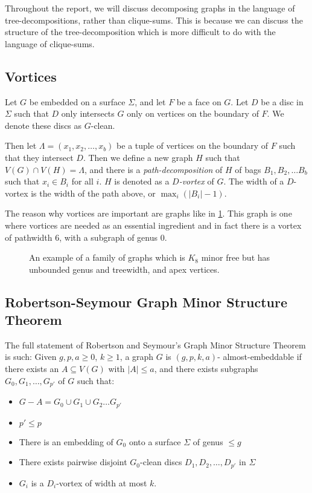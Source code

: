 Throughout the report, we will discuss decomposing graphs in the language of tree-decompositions, rather than clique-sums. This is because we can discuss the structure of the tree-decomposition which is more difficult to do with the language of clique-sums.

\subsection{Vortices}\label{sssec:vortices}
Let \(G\) be embedded on a surface \(\Sigma\), and let \(F\) be a face on \(G\). Let \(D\) be a disc in \(\Sigma\) such that \(D\) only intersects \(G\) only on vertices on the boundary of \(F\). We denote these discs as \(G\)-clean. 

Then let \(\Lambda = (x_1, x_2, \ldots, x_b)\) be a tuple of vertices on the boundary of \(F\) such that they intersect \(D\). Then we define a new graph \(H\) such that \(V(G) \cap V(H) = \Lambda\), and there is a \textit{path-decomposition} of \(H\) of bags \(B_1, B_2, \ldots B_b\) such that \(x_i \in B_i\) for all \(i\). \(H\) is denoted as a \textit{\(D\)-vortex} of \(G\). The width of a \(D\)-vortex is the width of the path above, or \(\max_i(|B_i| - 1)\). 

The reason why vortices are important are graphs like in \cref{fig:tenniscourt}. This graph is one where vortices are needed as an essential ingredient and in fact there is a vortex of pathwidth 6, with a subgraph of genus 0.

\begin{figure}[h]
	\centering
	
	\caption{An example of a family of graphs which is \(K_8\) minor free but has unbounded genus and treewidth, and apex vertices. }
	\label{fig:tenniscourt}
\end{figure}
\subsection{Robertson-Seymour Graph Minor Structure Theorem}\label{ssec:Robertson_Seymour_Graph_Structure}
The full statement of Robertson and Seymour's Graph Minor Structure Theorem \cite{robertsonGraphMinorsXVI2003}is such:
Given \(g, p, a \geq 0\), \(k \geq 1\), a graph \(G\) is \((g, p, k, a)\)- almost-embeddable if there exists an \(A \subseteq V(G)\) with \(|A| \leq a\), and there exists subgraphs \(G_0, G_1, \ldots,  G_{p'}\) of \(G\) such that:
\begin{itemize}
	\item \(G - A = G_0 \cup G_1 \cup G_2 \ldots G_{p'}\)
	\item \(p' \leq p\)
	\item There is an embedding of \(G_0\) onto a surface \(\Sigma\) of genus \(\leq g\)
	\item There exists pairwise disjoint \(G_0\)-clean discs \(D_1, D_2, \ldots, D_{p'}\) in \(\Sigma\)
	\item \(G_i\) is a \(D_i\)-vortex of width at most \(k\).
\end{itemize}

